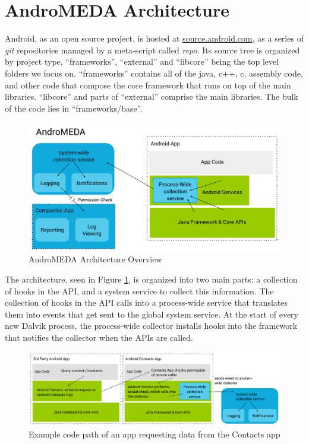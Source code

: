 \section{AndroMEDA Architecture}
Android, as an open source project, is hosted at \url{source.android.com}\citep{androidsource}, as a series of \textit{git} repositories managed by a meta-script called \textit{repo}. Its source tree is organized by project type, ``frameworks'', ``external'' and ``libcore'' being the top level folders we focus on. ``frameworks'' contains all of the java, c++, c, assembly code, and other code that compose the core framework that runs on top of the main libraries. ``libcore'' and parts of ``external'' comprise the main libraries. The bulk of the code lies in ``frameworks/base''.


\begin{figure}[t]
\begin{center}
\includegraphics[width=1.0\columnwidth]{figs/AndroMEDA-Architecture-Overview}
\caption{AndroMEDA Architecture Overview}
\label{fig:andromedaoverview}
\end{center}
\end{figure}

The architecture, seen in Figure \ref{fig:andromedaoverview}, is organized into two main parts: a collection of hooks in the API, and a system service to collect this information. The collection of hooks in the API calls into a process-wide service that translates them into events that get sent to the global system service. At the start of every new Dalvik process, the process-wide collector installs hooks into the framework that notifies the collector when the APIs are called.

\begin{figure}[t]
\begin{center}
\includegraphics[width=1.0\columnwidth]{figs/AndroMEDA-Inter-App-Example}
\caption{Example code path of an app requesting data from the Contacts app}
\label{fig:interapp-example}
\end{center}
\end{figure}

